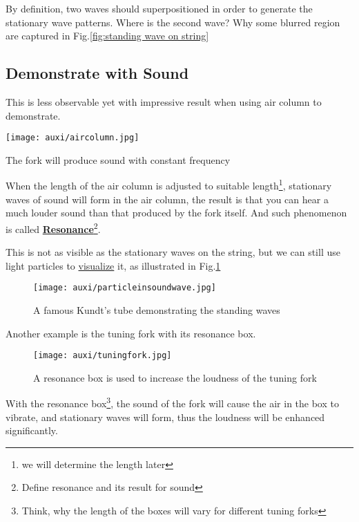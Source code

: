 \documentclass[a4paper]{tufte-handout}
\newenvironment{TaskBox} %
{\begin{tcolorbox}[breakable,colback=b1!30,colframe=b1,title=Task]} {\end{tcolorbox}}
\begin{document}
\begin{TaskBox}
By definition, two waves should superpositioned in order to generate the stationary wave patterns. Where is the second wave?
\vspace{1in}
\tcblower
Why some blurred region are captured in Fig.\ref{fig:standing wave on string}
\vspace{1in}
\end{TaskBox}

\subsection{Demonstrate with Sound}
This is less observable yet with impressive result when using air column to demonstrate.
\begin{marginfigure}[12cm]
\texttt{[image: auxi/aircolumn.jpg]}
\caption{The fork will produce sound with constant frequency}
\label{fig:forkcolumn}
\end{marginfigure}
When the length of the air column is adjusted to suitable length\footnote{we will determine the length later}, stationary waves of sound will form in the air column, the result is that you can hear a much louder sound than that produced by the fork itself. And such phenomenon is called \uline{\textbf{Resonance}}\footnote{Define resonance and its result for sound}.

This is not as visible as the stationary waves on the string, but we can still use light particles to \href{https://www.douyin.com/video/7091918664261209374}{visualize} it, as illustrated in Fig.\ref{fig:sound wave}
\begin{figure}[h]
\centering
\texttt{[image: auxi/particleinsoundwave.jpg]}
\caption{A famous Kundt's tube demonstrating the standing waves}
\label{fig:sound wave}
\end{figure}

Another example is the tuning fork with its resonance box.
\begin{figure}[h]
\centering
\texttt{[image: auxi/tuningfork.jpg]}
\caption{A resonance box is used to increase the loudness of the tuning fork}
\label{fig:resonance box}
\end{figure}

With the resonance box\footnote{Think, why the length of the boxes will vary for different tuning forks}, the sound of the fork will cause the air in the box to vibrate, and stationary waves will form, thus the loudness will be enhanced significantly.
\end{document}
